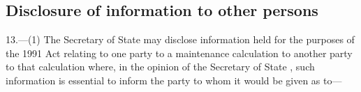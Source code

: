 \documentclass[12pt,a4paper]{article}
\begin{document}

\subsection[13. Disclosure of information to other persons]{Disclosure of information to other persons}

13.---(1)  The 
Secretary of State  %
may disclose information held for the purposes of the 1991 Act relating to one party to a maintenance calculation to another party to that calculation where, in the opinion of the 
Secretary of State%
, such information is essential to inform the party to whom it would be given as to—
\end{document}
